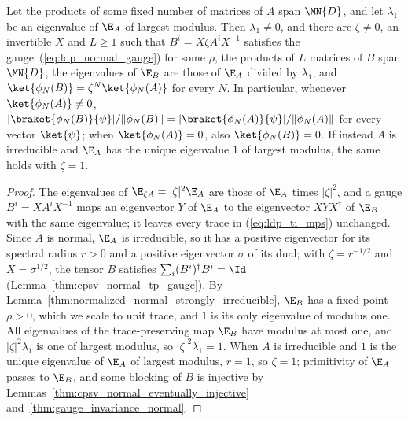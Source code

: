 \begin{lemma}
    \label{lem:ldp_normal_gauge_reduction}
    \leanok
    Let the products of some fixed number of matrices of $A$ span $\MN{D}$, and
    let $\lambda_1$ be an eigenvalue of $\E_A$ of largest modulus. Then
    $\lambda_1\ne0$, and there are $\zeta\ne0$, an invertible $X$ and $L\ge1$
    such that $B^i=X\zeta A^iX^{-1}$ satisfies the
    gauge~(\ref{eq:ldp_normal_gauge}) for some $\rho$, the products of $L$
    matrices of $B$ span $\MN{D}$, the eigenvalues of $\E_B$ are those of
    $\E_A$ divided by $\lambda_1$, and $\ket{\phi_N(B)}=\zeta^N\ket{\phi_N(A)}$
    for every $N$. In particular, whenever $\ket{\phi_N(A)}\neq0$,
    $\lvert\braket{\phi_N(B)}{\psi}\rvert/\lVert\phi_N(B)\rVert
        =\lvert\braket{\phi_N(A)}{\psi}\rvert/\lVert\phi_N(A)\rVert$ for every
    vector $\ket{\psi}$; when $\ket{\phi_N(A)}=0$, also $\ket{\phi_N(B)}=0$.
    If instead $A$ is irreducible and $\E_A$ has the unique eigenvalue $1$ of
    largest modulus, the same holds with $\zeta=1$.
\end{lemma}
\begin{proof}
    \leanok
    The eigenvalues of $\E_{\zeta A}=\lvert\zeta\rvert^2\E_A$ are those of
    $\E_A$ times $\lvert\zeta\rvert^2$, and a gauge $B^i=XA^iX^{-1}$ maps an
    eigenvector $Y$ of $\E_A$ to the eigenvector $XYX^\dagger$ of $\E_B$ with
    the same eigenvalue; it leaves every trace in (\ref{eq:ldp_ti_mps})
    unchanged. Since $A$ is normal, $\E_A$ is irreducible, so it has a
    positive eigenvector for its spectral radius $r>0$ and a positive
    eigenvector $\sigma$ of its dual; with $\zeta=r^{-1/2}$ and
    $X=\sigma^{1/2}$, the tensor $B$ satisfies $\sum_i(B^i)^\dagger B^i=\Id$
    (Lemma~\ref{thm:cpsv_normal_tp_gauge}). By
    Lemma~\ref{thm:normalized_normal_strongly_irreducible}, $\E_B$ has a fixed point
    $\rho>0$, which we scale to unit trace, and $1$ is its only eigenvalue of
    modulus one. All eigenvalues of the trace-preserving map $\E_B$ have
    modulus at most one, and $\lvert\zeta\rvert^2\lambda_1$ is one of largest
    modulus, so $\lvert\zeta\rvert^2\lambda_1=1$. When $A$ is irreducible and
    $1$ is the unique eigenvalue of $\E_A$ of largest modulus, $r=1$, so
    $\zeta=1$; primitivity of $\E_A$ passes to $\E_B$, and some blocking of $B$
    is injective by Lemmas~\ref{thm:cpsv_normal_eventually_injective}
    and~\ref{thm:gauge_invariance_normal}.
\end{proof}

